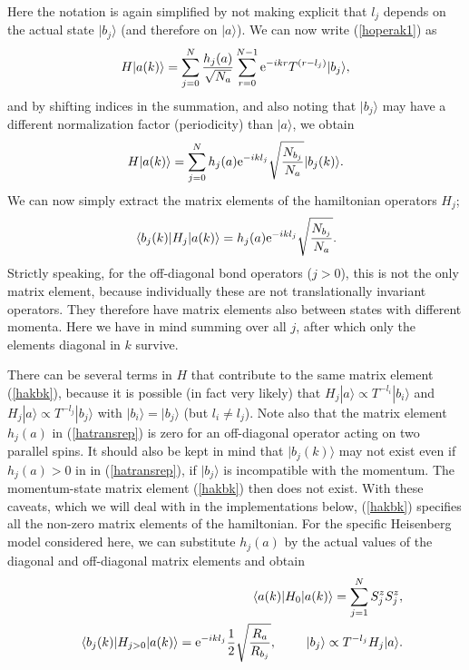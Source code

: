 \documentclass[draft,numberedheadings]{aipproc}
\begin{document}
Here the notation is again simplified by not making explicit that $l_j$ depends on the actual state $|b_j\rangle$ (and therefore on $|a\rangle$). 
We can now write (\ref{hoperak1}) as 
\begin{equation}
H|a(k)\rangle = 
 \sum_{j=0}^N \frac{h_j(a)}{\sqrt{N_a}} \sum_{r=0}^{N-1} {\rm e}^{-ikr} T^{(r-{l_j})}|b_j\rangle,
\end{equation}
and by shifting indices in the summation, and also noting that $|b_j\rangle$ may have a different normalization factor (periodicity)
than $|a\rangle$, we obtain
\begin{equation}
H|a(k)\rangle = 
\sum_{j=0}^N h_j(a){\rm e}^{-ik{l_j}} \sqrt{\frac{N_{b_j}}{N_a}}|b_j(k)\rangle.
\end{equation}
We can now simply extract the matrix elements of the hamiltonian operators $H_j$;
\begin{equation}
\langle b_j(k)|H_j|a(k)\rangle = h_j(a){\rm e}^{-ik{l_j}} \sqrt{\frac{N_{b_j}}{N_a}}.
\label{hakbk}
\end{equation}
Strictly speaking, for the off-diagonal bond operators ($j>0$), this is not the only matrix element, because individually these are not translationally invariant 
operators. They therefore have matrix elements also between states with different momenta. Here we have in mind summing over all $j$, after which only the elements 
diagonal in $k$ survive.

There can be several terms in $H$ that contribute to the same matrix element (\ref{hakbk}), because it is possible (in fact very likely) that 
$H_j|a\rangle \propto T^{-l_i}|b_i\rangle$ and $H_j|a\rangle \propto T^{-l_j}|b_j\rangle$ with $|b_i\rangle=|b_j\rangle$ (but $l_i \not= l_j$). Note also 
that the matrix element $h_j(a)$ in (\ref{hatransrep}) is zero for an off-diagonal operator acting on two parallel spins. It should also be kept in 
mind that $|b_j(k)\rangle$ may not exist even if $h_j(a)>0$ in in (\ref{hatransrep}), if $|b_j\rangle$ is incompatible with the momentum.
The momentum-state matrix element (\ref{hakbk}) then does not exist.  With these caveats, which we will deal with in the implementations below, (\ref{hakbk}) 
specifies all the non-zero matrix elements of the hamiltonian. For the specific Heisenberg model considered here, we can substitute $h_j(a)$ by the actual 
values of the diagonal and off-diagonal matrix elements and obtain
\begin{eqnarray}
&&\langle a(k)|H_0|a(k)\rangle = \sum_{j=1}^N S^z_jS^z_j, \label{hmathchain1}\\
&&\langle b_j(k)|H_{j>0}|a(k)\rangle = {\rm e}^{-ik{l_j}}\frac{1}{2} \sqrt{\frac{R_a}{R_{b_j}}},~~~~~~~|b_j\rangle \propto T^{-l_j}H_j|a\rangle.
\label{hmathchain2}
\end{eqnarray}
\end{document}
